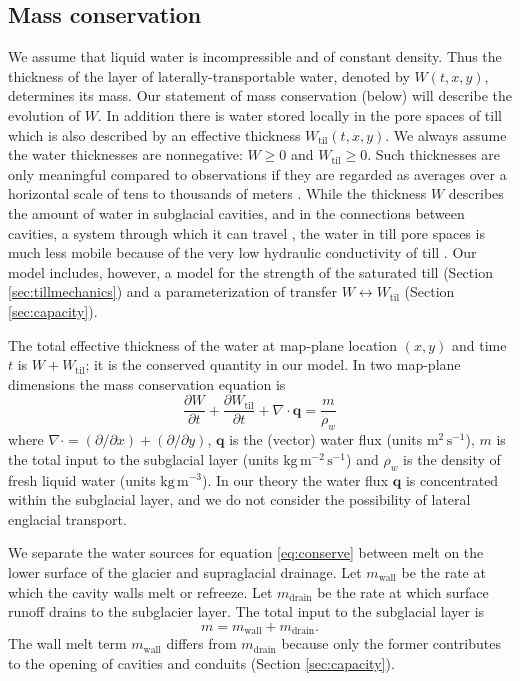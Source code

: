 \documentclass[gmd]{copernicus}   %
\newcommand{\text}{\textrm}
\newcommand\bq{\mathbf{q}}
\newcommand{\Div}{\nabla\cdot}
\newcommand{\Wtil}{W_{\text{til}}}
\begin{document}
\subsection{Mass conservation}  We assume that liquid water is incompressible and of constant density.  Thus the thickness of the layer of laterally-transportable water, denoted by $W(t,x,y)$, determines its mass.  Our statement of mass conservation (below) will describe the evolution of $W$.  In addition there is water stored locally in the pore spaces of till \citep{Tulaczyketal2000b} which is also described by an effective thickness $\Wtil(t,x,y)$.  We always assume the water thicknesses are nonnegative: $W \ge 0$ and $\Wtil \ge 0$.  Such thicknesses are only meaningful compared to observations if they are regarded as averages over a horizontal scale of tens to thousands of meters \citep{FlowersClarke2002_theory}.  While the thickness $W$ describes the amount of water in subglacial cavities, and in the connections between cavities, a system through which it can travel \citep{Kamb1987}, the water in till pore spaces is much less mobile because of the very low hydraulic conductivity of till \citep{TrufferEchelmeyerHarrison2001,Tulaczyketal2000}.  Our model includes, however, a model for the strength of the saturated till (Section \ref{sec:tillmechanics}) and a parameterization of transfer $W \leftrightarrow \Wtil$ (Section \ref{sec:capacity}).

The total effective thickness of the water at map-plane location $(x,y)$ and time $t$ is $W + \Wtil$; it is the conserved quantity in our model.  In two map-plane dimensions the mass conservation equation is \citep[compare][]{Clarke05}
\begin{equation} \label{eq:conserve}
\frac{\partial W}{\partial t} + \frac{\partial \Wtil}{\partial t} + \Div \bq = \frac{m}{\rho_w}
\end{equation}
where $\Div = (\partial/\partial x) + (\partial/\partial y)$, $\bq$ is the (vector) water flux (units $\text{m}^2\,\text{s}^{-1}$), $m$ is the total input to the subglacial layer (units $\text{kg}\,\text{m}^{-2}\,\text{s}^{-1}$) and $\rho_w$ is the density of fresh liquid water (units $\text{kg}\,\text{m}^{-3}$).  In our theory the water flux $\bq$ is concentrated within the subglacial layer, and we do not consider the possibility of lateral englacial transport.

We separate the water sources for equation \eqref{eq:conserve} between melt on the lower surface of the glacier and supraglacial drainage.  Let $m_{\text{wall}}$ be the rate at which the cavity walls melt or refreeze.  Let $m_{\text{drain}}$ be the rate at which surface runoff drains to the subglacier layer.  The total input to the subglacial layer is
\newcommand{\mwall}{m_{\text{wall}}}
\newcommand{\mdrain}{m_{\text{drain}}}
\begin{equation}
m = \mwall + \mdrain. \label{eq:totalinput}
\end{equation}
The wall melt term $\mwall$ differs from $\mdrain$ because only the former contributes to the opening of cavities and conduits (Section \ref{sec:capacity}).
\end{document}
